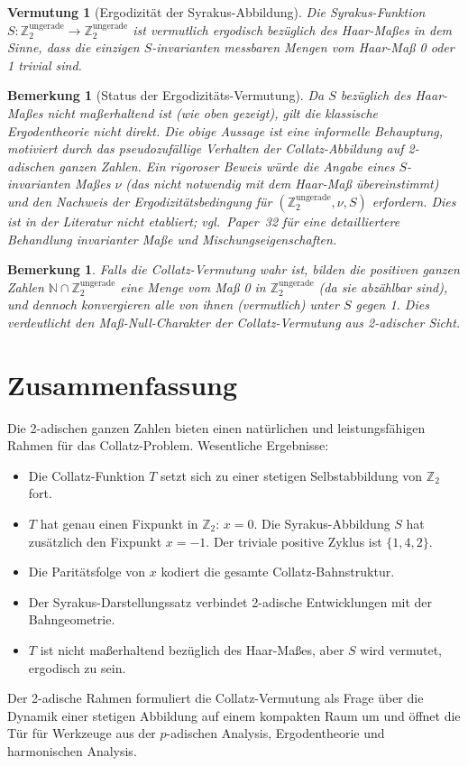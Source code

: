 \documentclass[12pt,a4paper]{article}
\newtheorem{remark}[theorem]{Bemerkung}
\newtheorem{conjecture}[theorem]{Vermutung}
\begin{document}
\begin{conjecture}[Ergodizität der Syrakus-Abbildung]\label{conj:ergodisch_S}
Die Syrakus-Funktion $S\colon \mathbb{Z}_2^{\text{ungerade}} \to \mathbb{Z}_2^{\text{ungerade}}$
ist vermutlich \emph{ergodisch bezüglich des Haar-Maßes} in dem Sinne, dass die einzigen
$S$-invarianten messbaren Mengen vom Haar-Maß 0 oder 1 trivial sind.
\end{conjecture}

\begin{remark}[Status der Ergodizitäts-Vermutung]
Da $S$ bezüglich des Haar-Maßes \emph{nicht} maßerhaltend ist (wie oben gezeigt),
gilt die klassische Ergodentheorie nicht direkt. Die obige Aussage ist eine informelle
Behauptung, motiviert durch das pseudozufällige Verhalten der Collatz-Abbildung auf
2-adischen ganzen Zahlen. Ein rigoroser Beweis würde die Angabe eines $S$-invarianten
Maßes $\nu$ (das nicht notwendig mit dem Haar-Maß übereinstimmt) und den Nachweis
der Ergodizitätsbedingung für $(\mathbb{Z}_2^{\text{ungerade}}, \nu, S)$ erfordern.
Dies ist in der Literatur nicht etabliert; vgl.\ Paper~32 für eine detailliertere
Behandlung invarianter Maße und Mischungseigenschaften.
\end{remark}

\begin{remark}\label{rem:vermutung_mass}
Falls die Collatz-Vermutung wahr ist, bilden die positiven ganzen Zahlen
$\mathbb{N} \cap \mathbb{Z}_2^{\text{ungerade}}$ eine Menge vom Maß 0 in
$\mathbb{Z}_2^{\text{ungerade}}$ (da sie abzählbar sind), und dennoch konvergieren
\emph{alle} von ihnen (vermutlich) unter $S$ gegen 1. Dies verdeutlicht den
Maß-Null-Charakter der Collatz-Vermutung aus 2-adischer Sicht.
\end{remark}

\section{Zusammenfassung}

Die 2-adischen ganzen Zahlen bieten einen natürlichen und leistungsfähigen Rahmen für
das Collatz-Problem. Wesentliche Ergebnisse:
\begin{itemize}
  \item Die Collatz-Funktion $T$ setzt sich zu einer stetigen Selbstabbildung von
        $\mathbb{Z}_2$ fort.
  \item $T$ hat genau einen Fixpunkt in $\mathbb{Z}_2$: $x=0$. Die Syrakus-Abbildung $S$ hat zusätzlich den Fixpunkt $x=-1$. Der triviale positive Zyklus ist $\{1, 4, 2\}$.
  \item Die Paritätsfolge von $x$ kodiert die gesamte Collatz-Bahnstruktur.
  \item Der Syrakus-Darstellungssatz verbindet 2-adische Entwicklungen mit der Bahngeometrie.
  \item $T$ ist nicht maßerhaltend bezüglich des Haar-Maßes, aber $S$ wird vermutet, ergodisch zu sein.
\end{itemize}
Der 2-adische Rahmen formuliert die Collatz-Vermutung als Frage über die Dynamik einer
stetigen Abbildung auf einem kompakten Raum um und öffnet die Tür für Werkzeuge aus
der $p$-adischen Analysis, Ergodentheorie und harmonischen Analysis.
\end{document}
